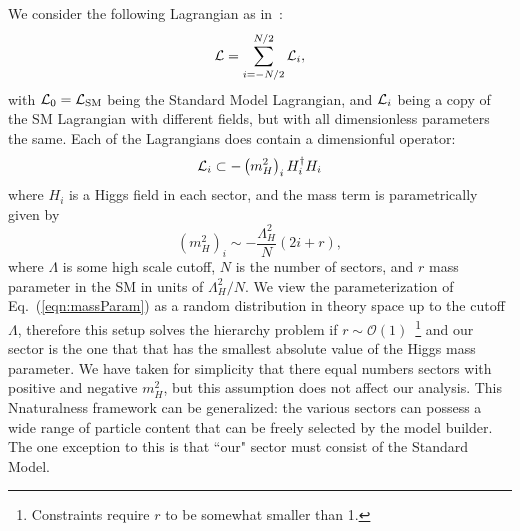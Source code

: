 \documentclass[nofootinbib,twocolumn,preprintnumbers]{revtex4-1}
\begin{document}
We consider the following Lagrangian as in~\cite{Arkani-Hamed:2016rle}:
\begin{equation}
{\cal L} = \sum_{i=-N/2}^{N/2} {\cal L}_i,
\end{equation}
with ${\cal L}_0 = {\cal L}_{\rm SM}$ being the Standard Model Lagrangian, and ${\cal L}_i$ being a copy of the SM Lagrangian with different fields, but with all dimensionless parameters the same. Each of the Lagrangians does contain a dimensionful operator:
\begin{equation}
{\cal L}_i \subset  - \left(m_H^2\right)_i H_i^\dagger H_i  
\end{equation}
where $H_i$ is a Higgs field in each sector, and the mass term is parametrically given by
\begin{equation}\label{eqn:massParam}
\left(m_H^2\right)_i \sim -\frac{\Lambda_H^2}{N}(2i+r),
\end{equation}
where $\Lambda$ is some high scale cutoff, $N$ is the number of sectors, and $r$ mass parameter in the SM in units of $\Lambda_H^2/N$. We view the parameterization of Eq.~(\ref{eqn:massParam}) as a random distribution in theory space up to the cutoff $\Lambda$, therefore this setup solves the hierarchy problem if $r \sim \mathcal{O}(1)$~\cite{Arkani-Hamed:2016rle}\footnote{Constraints require $r$ to be somewhat smaller than 1.} and our sector is the one that that has the smallest absolute value of the Higgs mass parameter. We have taken for simplicity that there equal numbers sectors with positive and negative $m_H^2$, but this assumption does not affect our analysis. This Nnaturalness framework can be generalized: the various sectors can possess a wide range of particle content that can be freely selected by the model builder. The one exception to this is that ``our" sector must consist of the Standard Model.
\end{document}
